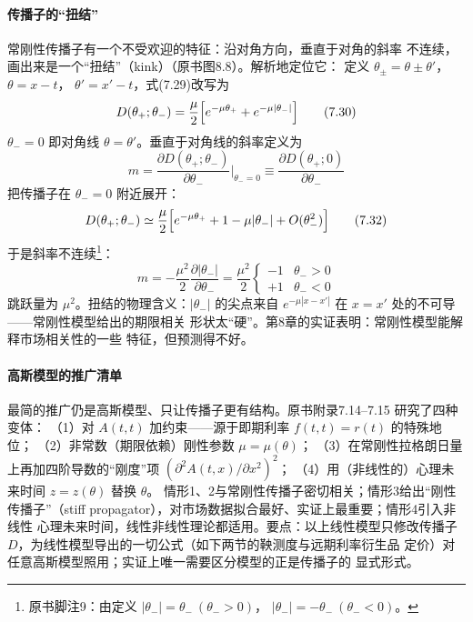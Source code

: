 \paragraph{传播子的“扭结”}
常刚性传播子有一个不受欢迎的特征：沿对角方向，垂直于对角的斜率
不连续，画出来是一个“扭结”（kink）（原书图8.8）。解析地定位它：
定义 $\theta_{\pm}=\theta\pm\theta'$，$\theta=x-t$，
$\theta'=x'-t$，式(7.29)改写为
\begin{equation*}
D(\theta_{+};\theta_{-})=\frac{\mu}{2}
\Bigl[e^{-\mu\theta_{+}}+e^{-\mu|\theta_{-}|}\Bigr]
\tag{7.30}
\end{equation*}
$\theta_-=0$ 即对角线 $\theta=\theta'$。垂直于对角线的斜率定义为
\begin{equation*}
m=\frac{\partial D(\theta_{+};\theta_{-})}{\partial\theta_{-}}
\Bigr|_{\theta_{-}=0}\equiv
\frac{\partial D(\theta_{+};0)}{\partial\theta_{-}}
\tag{7.31}
\end{equation*}
把传播子在 $\theta_-=0$ 附近展开：
\begin{equation*}
D(\theta_{+};\theta_{-})\simeq\frac{\mu}{2}
\Bigl[e^{-\mu\theta_{+}}+1-\mu|\theta_{-}|+O(\theta_{-}^{2})\Bigr]
\tag{7.32}
\end{equation*}
于是斜率不连续\footnote{原书脚注9：由定义
$|\theta_{-}|=\theta_{-}\ (\theta_{-}>0)$，
$|\theta_{-}|=-\theta_{-}\ (\theta_{-}<0)$。}：
\begin{equation*}
m=-\frac{\mu^{2}}{2}\frac{\partial|\theta_{-}|}{\partial\theta_{-}}
=\frac{\mu^{2}}{2}\begin{cases}-1&\theta_{-}>0\\ +1&\theta_{-}<0
\end{cases}
\end{equation*}
跳跃量为 $\mu^{2}$。扭结的物理含义：$|\theta_{-}|$ 的尖点来自
$e^{-\mu|x-x'|}$ 在 $x=x'$ 处的不可导——常刚性模型给出的期限相关
形状太“硬”。第8章的实证表明：常刚性模型能解释市场相关性的一些
特征，但预测得不好。

\paragraph{高斯模型的推广清单}
最简的推广仍是高斯模型、只让传播子更有结构。原书附录7.14--7.15
研究了四种变体：
（1）对 $A(t,t)$ 加约束——源于即期利率 $f(t,t)=r(t)$ 的特殊地位；
（2）非常数（期限依赖）刚性参数 $\mu=\mu(\theta)$；
（3）在常刚性拉格朗日量上再加四阶导数的“刚度”项
$(\partial^{2}A(t,x)/\partial x^{2})^{2}$；
（4）用（非线性的）心理未来时间 $z=z(\theta)$ 替换 $\theta$。
情形1、2与常刚性传播子密切相关；情形3给出“刚性传播子”（stiff
propagator），对市场数据拟合最好、实证上最重要；情形4引入非线性
心理未来时间，线性非线性理论都适用。要点：以上线性模型只修改传播子
$D$，为线性模型导出的一切公式（如下两节的鞅测度与远期利率衍生品
定价）对任意高斯模型照用；实证上唯一需要区分模型的正是传播子的
显式形式。

